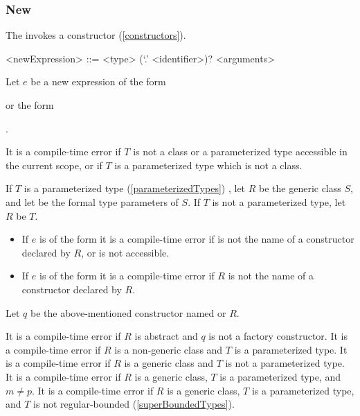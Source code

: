 \documentclass[makeidx]{article}
\begin{document}
\subsubsection{New}

\LMHash{}%
The  invokes a constructor (\ref{constructors}).

\begin{grammar}
<newExpression> ::= \NEW{} <type> (`.' <identifier>)? <arguments>
\end{grammar}

\LMHash{}%
Let $e$ be a new expression of the form

or the form

.

\LMHash{}%
It is a compile-time error if $T$ is not
a class or a parameterized type accessible in the current scope,
or if $T$ is a parameterized type which is not a class.

\LMHash{}%
If $T$ is a parameterized type (\ref{parameterizedTypes})
,
let $R$ be the generic class $S$,
and let
be the formal type parameters of $S$.
If $T$ is not a parameterized type, let $R$ be $T$.

\begin{itemize}
\item
  If $e$ is of the form
  it is a compile-time error if  is not the name of
  a constructor declared by $R$, or \id{} is not accessible.
\item
  If $e$ is of the form
  it is a compile-time error if $R$ is not the name of
  a constructor declared by $R$.
\end{itemize}

\LMHash{}%
Let $q$ be the above-mentioned constructor named  or $R$.

\LMHash{}%
It is a compile-time error if $R$ is abstract
and $q$ is not a factory constructor.
It is a compile-time error if $R$ is a non-generic class
and $T$ is a parameterized type.
It is a compile-time error if $R$ is a generic class
and $T$ is not a parameterized type.
It is a compile-time error if $R$ is a generic class,
$T$ is a parameterized type, and $m \not= p$.
It is a compile-time error if $R$ is a generic class,
$T$ is a parameterized type,
and $T$ is not regular-bounded
(\ref{superBoundedTypes}).
\end{document}
